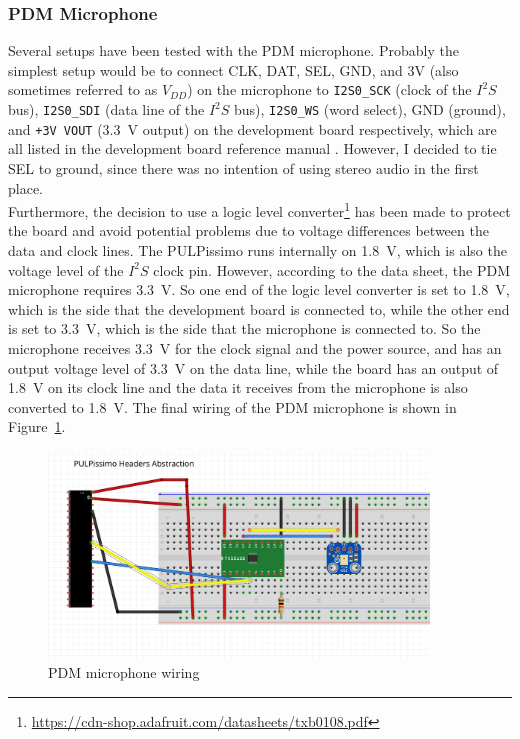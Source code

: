 \subsubsection{PDM Microphone}

Several setups have been tested with the PDM microphone.
Probably the simplest setup would be to connect CLK, DAT, SEL, GND, and 3V (also sometimes referred to as $V_{DD}$) on the microphone
to \lstinline{I2S0_SCK} (clock of the $I^2S$ bus), \lstinline{I2S0_SDI} (data line of the $I^2S$ bus), \lstinline{I2S0_WS} (word select), GND (ground),
and \lstinline{+3V VOUT} (\SI{3.3}{\volt} output) on the development board respectively,
which are all listed in the development board reference manual \cite{pulpissimo}.
However, I decided to tie SEL to ground, since there was no intention of using stereo audio in the first place.\\
Furthermore, the decision to use a logic level converter\footnote{\url{https://cdn-shop.adafruit.com/datasheets/txb0108.pdf}}
has been made to protect the board and avoid potential problems due to voltage differences between the data and clock lines.
The PULPissimo runs internally on \SI{1.8}{\volt}, which is also the voltage level of the $I^2S$ clock pin.
However, according to the data sheet, the PDM microphone requires \SI{3.3}{\volt}.
So one end of the logic level converter is set to \SI{1.8}{\volt}, which is the side that the development board
is connected to, while the other end is set to \SI{3.3}{\volt}, which is the side that the microphone is connected to.
So the microphone receives \SI{3.3}{\volt} for the clock signal and the power source, and has an output voltage level
of \SI{3.3}{\volt} on the data line,
while the board has an output of \SI{1.8}{\volt} on its clock line and the data it receives from the microphone is also
converted to \SI{1.8}{\volt}.
The final wiring of the PDM microphone is shown in Figure~\ref{fig:pdm_wiring}.

\begin{figure}[H]
    \centering
    \includegraphics[width=0.9\textwidth]{figures/pdm/wiring.png}
    \caption[PDM microphone wiring with an abstraction for the PULPissimo]{PDM microphone wiring}
    \label{fig:pdm_wiring}
\end{figure}

